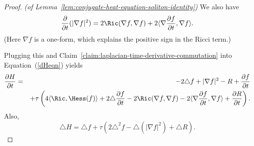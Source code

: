 \begin{proof}{\em (of Lemma~\ref{lem:conjugate-heat-equation-soliton-identity})}
We also have
$$\frac{\partial }{\partial t}(|\nabla f|^2)=2\Ric(\nabla f,\nabla f)+2\langle
\nabla\frac{\partial f}{\partial t},\nabla f\rangle.$$ (Here $\nabla
f$ is a one-form, which explains the positive sign in the Ricci
term.)



Plugging this and Claim~\ref{claim:laplacian-time-derivative-commutation} into Equation~(\ref{dHeqn})
yields
\begin{eqnarray*}
\frac{\partial H}{\partial t} & = & -2\triangle f+|\nabla f|^2-R+\frac{\partial f}{\partial t} \\
& & + \tau \left(4\langle \Ric,\Hess(f)\rangle +2\triangle
\frac{\partial f}{\partial t} -2\Ric(\nabla f,\nabla f)
-2\langle \nabla\frac{\partial f}{\partial t},\nabla
f\rangle+\frac{\partial R}{\partial t}\right).
\end{eqnarray*}
Also,
\begin{equation*} \triangle H  =  \triangle
f+\tau\left(2\triangle^2f-\triangle( |\nabla f|^2)+\triangle
R\right).
\end{equation*}


\end{proof}
